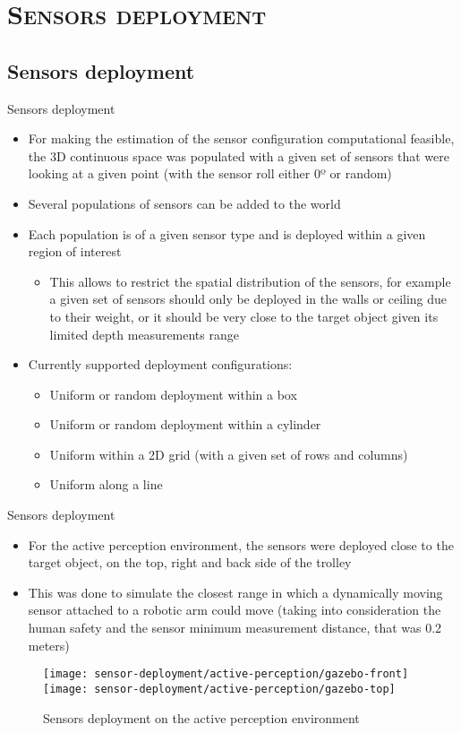 \section{\scshape Sensors deployment}
\subsection*{Sensors deployment}
\begin{frame}{Sensors deployment}
	\begin{itemize}
		\item For making the estimation of the sensor configuration computational feasible, the 3D continuous space was populated with a given set of sensors that were looking at a given point (with the sensor roll either 0º or random)
		\item Several populations of sensors can be added to the world
		\item Each population is of a given sensor type and is deployed within a given region of interest 
		\begin{itemize}
			\item This allows to restrict the spatial distribution of the sensors, for example a given set of sensors should only be deployed in the walls or ceiling due to their weight, or it should be very close to the target object given its limited depth measurements range
		\end{itemize}
		\item Currently supported deployment configurations:
		\begin{itemize}
			\item Uniform or random deployment within a box
			\item Uniform or random deployment within a cylinder
			\item Uniform within a 2D grid (with a given set of rows and columns)
			\item Uniform along a line
		\end{itemize}
	\end{itemize}
\end{frame}

\begin{frame}{Sensors deployment}
	\begin{itemize}
		\item For the active perception environment, the sensors were deployed close to the target object, on the top, right and back side of the trolley
		\item This was done to simulate the closest range in which a dynamically moving sensor attached to a robotic arm could move (taking into consideration the human safety and the sensor minimum measurement distance, that was 0.2 meters)
	\end{itemize}
	\begin{figure}
		\centering
		\texttt{[image: sensor-deployment/active-perception/gazebo-front]}
		\texttt{[image: sensor-deployment/active-perception/gazebo-top]}
		\caption{Sensors deployment on the active perception environment}
	\end{figure}
\end{frame}

